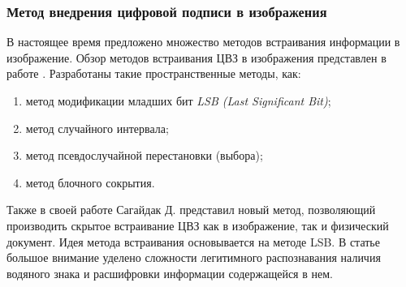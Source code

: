 \subsubsection{Метод внедрения цифровой подписи в изображения}
\par В настоящее время предложено множество методов встраивания информации в изображение. Обзор методов встраивания ЦВЗ в изображения представлен в работе \cite{sagaydak2014}. Разработаны такие пространственные методы, как:
\begin{enumerate}
\item метод модификации младших бит \textit{LSB (Last Significant Bit)};
\item метод случайного интервала;
\item метод псевдослучайной перестановки (выбора);
\item метод блочного сокрытия.
\end{enumerate}
Также в своей работе Сагайдак Д. представил новый метод, позволяющий производить скрытое встраивание ЦВЗ как в изображение, так и физический документ. Идея метода встраивания основывается на методе LSB. В статье большое внимание уделено сложности легитимного распознавания наличия водяного знака и расшифровки информации содержащейся в нем. 